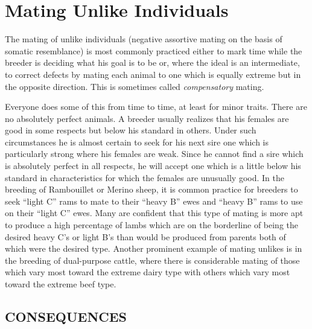\chapter{Mating Unlike Individuals}
\label{cha:Lush_Chapter_28}

The mating of unlike individuals (negative assortive mating on the
basis of somatic resemblance) is most commonly practiced either to
mark time while the breeder is deciding what his goal is to be or, where
the ideal is an intermediate, to correct defects by mating each animal
to one which is equally extreme but in the opposite direction. This is
sometimes called \textit{compensatory} mating.

Everyone does some of this from time to time, at least for minor
traits. There are no absolutely perfect animals. A breeder usually realizes
that his females are good in some respects but below his standard in
others. Under such circumstances he is almost certain to seek for his
next sire one which is particularly strong where his females are weak.
Since he cannot find a sire which is absolutely perfect in all respects, he
will accept one which is a little below his standard in characteristics for
which the females are unusually good. In the breeding of Rambouillet
or Merino sheep, it is common practice for breeders to seek ``light C''
rams to mate to their ``heavy B'' ewes and ``heavy B'' rams to use on
their ``light C'' ewes. Many are confident that this type of mating is
more apt to produce a high percentage of lambs which are on the borderline
of being the desired heavy C's or light B's than would be produced
from parents both of which were the desired type. Another
prominent example of mating unlikes is in the breeding of dual-purpose
cattle, where there is considerable mating of those which vary most
toward the extreme dairy type with others which vary most toward the
extreme beef type.

\section*{CONSEQUENCES}

